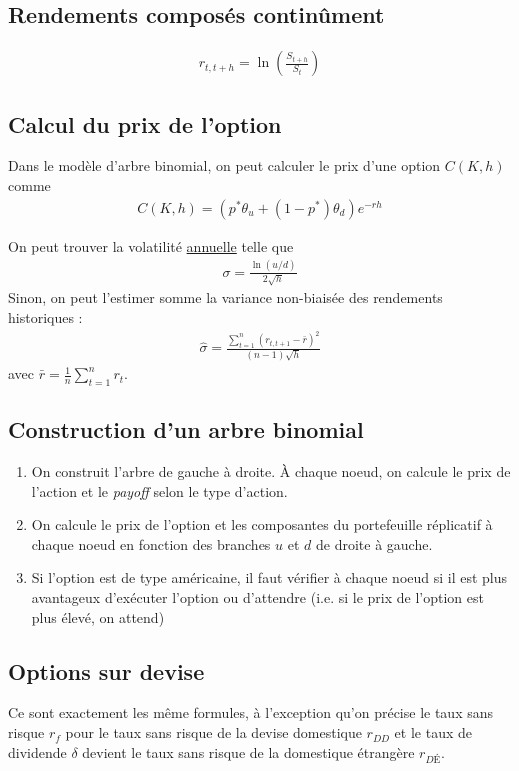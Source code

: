 \documentclass[10pt, french]{article}
\begin{document}
\begin{multicols*}{2}
\subsection*{Rendements composés continûment}
\begin{align*}
	r_{t,t+h} = \ln \left( \frac{S_{t+h}}{S_t} \right)
\end{align*}


\subsection*{Calcul du prix de l'option}
Dans le modèle d'arbre binomial, on peut calculer le prix d'une option $C(K,h)$ comme
\begin{align*}
	C(K,h) = (p^* \theta_u + (1-p^*)\theta_d) e^{-rh}
\end{align*}



On peut trouver la volatilité \underline{annuelle} telle que
\begin{align*}
	\sigma = \frac{\ln \left( u/d \right)}{2 \sqrt{h}}
\end{align*}
Sinon, on peut l'estimer somme la variance non-biaisée des rendements historiques :
\begin{align*}
	\hat{\sigma} = \frac{\sum_{t=1}^{n} (r_{t, t+1} - \bar{r})^2}{(n-1)\sqrt{h}}
\end{align*}
avec $\bar{r} = \frac{1}{n} \sum_{t=1}^n r_t$.

\subsection*{Construction d'un arbre binomial}
\begin{enumerate}
	\item On construit l'arbre de gauche à droite. À chaque noeud, on calcule le prix de l'action et le \emph{payoff} selon le type d'action.
	\item On calcule le prix de l'option et les composantes du portefeuille réplicatif à chaque noeud en fonction des branches $u$ et $d$ de droite à gauche.
	\item Si l'option est de type américaine, il faut vérifier à chaque noeud si il est plus avantageux d'exécuter l'option ou d'attendre (i.e. si le prix de l'option est plus élevé, on attend)
\end{enumerate}


\subsection*{Options sur devise}
Ce sont exactement les même formules, à l'exception qu'on précise le taux sans risque $r_f$ pour le taux sans risque de la devise domestique $r_{DD}$ et le taux de dividende $\delta$ devient le taux sans risque de la domestique étrangère $r_{DÉ}$.



\end{multicols*}
\end{document}
